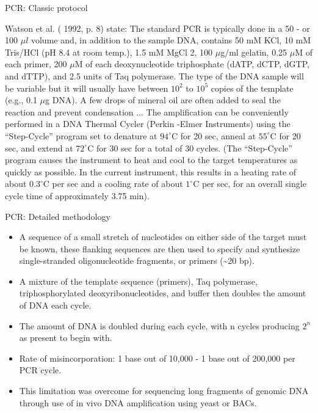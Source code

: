 \documentclass[
  ignorenonframetext,
  aspectratio=169]{beamer}
\providecommand{\tightlist}{%
  \setlength{\itemsep}{0pt}\setlength{\parskip}{0pt}}
\begin{document}
\begin{frame}{PCR: Classic protocol}
\protect\hypertarget{pcr-classic-protocol}{}
\begin{block}{Watson et al. ( 1992, p. 8) state:}
The standard PCR is typically done in a 50 - or 100 $\mu l$ volume and, in addition to the sample DNA, contains 50 mM KCl, 10 mM Tris/HCl (pH 8.4 at room temp.), 1.5 mM MgCl 2, 100 $\mu$g/ml gelatin, 0.25 $\mu$M of each primer, 200 $\mu$M of each deoxynucleotide triphosphate (dATP, dCTP, dGTP, and dTTP), and 2.5 units of Taq polymerase. The type of the DNA sample will be variable but it will usually have between $10^2$ to $10^5$ copies of the template (e.g., 0.1 $\mu$g DNA). A few drops of mineral oil are often added to seal the reaction and prevent condensation ... The amplification can be conveniently performed in a DNA Thermal Cycler (Perkin -Elmer Instruments) using the “Step-Cycle” program set to denature at $94^\circ$C for 20 sec, anneal at $55^\circ$C for 20 sec, and extend at  $72^\circ$C for 30 sec for a total of 30 cycles. (The “Step-Cycle” program causes the instrument to heat and cool to the target temperatures as quickly as possible. In the current instrument, this results in a heating rate of about  $0.3^\circ$C per sec and a cooling rate of about  $1^\circ$C per sec, for an overall single cycle time of approximately 3.75 min).
\end{block}
\end{frame}

\begin{frame}{PCR: Detailed methodology}
\protect\hypertarget{pcr-detailed-methodology}{}
\begin{itemize}
\tightlist
\item
  A sequence of a small stretch of nucleotides on either side of the
  target must be known, these flanking sequences are then used to
  specify and synthesize single-stranded oligonucleotide fragments, or
  primers (\textasciitilde20 bp).
\item
  A mixture of the template sequence (primers), Taq polymerase,
  triphosphorylated deoxyribonucleotides, and buffer then doubles the
  amount of DNA each cycle.
\item
  The amount of DNA is doubled during each cycle, with n cycles
  producing \(2^n\) as present to begin with.
\item
  Rate of misincorporation: 1 base out of 10,000 - 1 base out of 200,000
  per PCR cycle.
\item
  This limitation was overcome for sequencing long fragments of genomic
  DNA through use of in vivo DNA amplification using yeast or BACs.
\end{itemize}
\end{frame}
\end{document}
